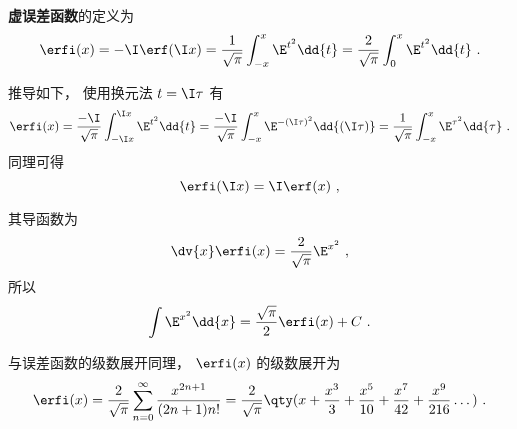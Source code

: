 

\textbf{虚误差函数}的定义为
\begin{equation}
\erfi(x) = -\I \erf(\I x) = \frac{1}{\sqrt{\pi}} \int_{-x}^x \E^{t^2} \dd{t}
= \frac{2}{\sqrt{\pi}} \int_0^x \E^{t^2} \dd{t}~.
\end{equation}

推导如下， 使用换元法 $t = \I \tau$ 有
\begin{equation}
\erfi(x) = \frac{-\I}{\sqrt{\pi}} \int_{-\I x}^{\I x} \E^{t^2} \dd{t}
= \frac{-\I}{\sqrt{\pi}} \int_{-x}^{x} \E^{-(\I \tau)^2} \dd{(\I \tau)}
= \frac{1}{\sqrt{\pi}} \int_{-x}^{x} \E^{\tau^2} \dd{\tau}~.
\end{equation}
同理可得
\begin{equation}
\erfi(\I x) = \I \erf(x)~,
\end{equation}

其导函数为
\begin{equation}
\dv{x} \erfi(x) = \frac{2}{\sqrt{\pi}} \E^{x^2}~,
\end{equation}
所以
\begin{equation}
\int \E^{x^2} \dd{x} = \frac{\sqrt{\pi}}{2} \erfi(x) + C~.
\end{equation}

与误差函数的级数展开同理， $\erfi(x)$ 的级数展开为
\begin{equation}
\erfi(x) = \frac{2}{\sqrt{\pi}} \sum_{n=0}^\infty \frac{x^{2n+1}}{(2n+1)n!}
= \frac{2}{\sqrt{\pi}}\qty(x + \frac{x^3}{3} + \frac{x^5}{10} + \frac{x^7}{42} + \frac{x^9}{216} \dots)~.
\end{equation}
